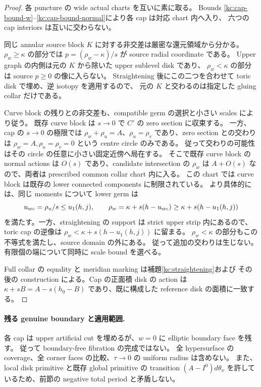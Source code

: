 \begin{proof}
各 puncture の wide actual charts を互いに素に取る。
Bounds \eqref{kc:cap-bound-w}--\eqref{kc:cap-bound-normal}により各 cap は対応 chart 内へ入り、
六つの cap interiors は互いに交わらない。

同じ annular source block $K$ に対する非交差は厳密な還元領域から分かる。
$\rho_w\ge\kappa$ の部分では $p=(\rho_w-\kappa)/s$ が source radial coordinate である。
Upper graph の内側は元の $K$ から除いた upper sublevel disk であり、
$\rho_w<\kappa$ の部分は source $p\ge0$ の像に入らない。
Straightening 後にこの二つを合わせて toric disk で埋め、逆 isotopy を適用するので、
元の $K$ と交わるのは指定した gluing collar だけである。

Curve block の残りとの非交差も、compatible germ の選択と小さい scales により従う。
既存 curve block は $s\to0$ で $C'$ の zero section に収束する。
一方、cap の $s\to0$ の極限では
$\rho_w+\rho_u=A$、$\rho_u=\rho_v$ であり、zero section との交わりは
$\rho_w=A,\rho_u=\rho_v=0$ という centre circle のみである。
従って交わりの可能性はその circle の任意に小さい固定近傍へ局在する。
そこで既存 curve block の normal actions は $O(s)$ であり、candidate intersection の
$\rho_w$ は $A+O(s)$ なので、両者は prescribed common collar chart 内に入る。
この chart では curve block は既存の lower connected components に制限されている。
より具体的には、同じ moments について lower germ は
\[
 u_{\rm src}=\rho_u/s\le u_1(h,j),\qquad
 \rho_w=\kappa+s(h-u_{\rm src})\ge\kappa+s(h-u_1(h,j))
\]
を満たす。一方、straightening の support は strict upper strip 内にあるので、
toric cap の逆像は $\rho_w<\kappa+s(h-u_1(h,j))$ に留まる。
$\rho_w<\kappa$ の部分もこの不等式を満たし、source domain の外にある。
従って追加の交わりは生じない。有限個の端について同時に scale bound を選べる。

Full collar の equality と meridian marking は補題\ref{kc:straightening}および
その後の construction による。Cap の正面積 disk の action は
$\kappa+sB=A-s(h_0-B)$ であり、既に構成した reference disk の面積に一致する。
\end{proof}

\paragraph{残る genuine boundary と適用範囲.}
各 cap は upper artificial cut を埋めるが、$w=0$ に elliptic boundary face を残す。
従って boundary-free fibration の完成ではない。
全 hypersurface の coverage、全 corner faces の比較、$\tau\to0$ の uniform radius は含めない。
また、local disk primitive と既存 global primitive の transition
$(A-I^0)d\theta_x$ を許しているため、前節の negative total period と矛盾しない。

